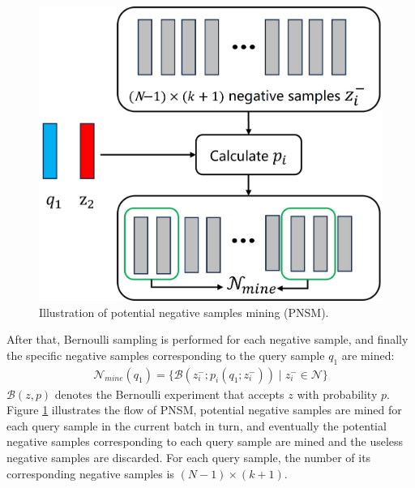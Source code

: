 \documentclass[review]{elsarticle}
\begin{document}
\begin{figure}[!t]
\centering

\includegraphics[scale=0.5]{figure4.jpg}
\caption{Illustration of potential negative samples mining (PNSM).}
\label{fig4}
\end{figure}

After that, Bernoulli sampling is performed for each negative sample, and finally the specific negative samples corresponding to the query sample $q_1$ are mined: 
\begin{equation}
\begin{aligned}
\mathcal{N}_{mine}(q_1)=\{ \mathcal{B}(z_i^{-};p_i(q_1;z_i^{-}))\mid z_i^{-}\in \mathcal{N}    \}
     \label{equation9}
\end{aligned}
\end{equation}
$\mathcal{B}(z,p)$ denotes the Bernoulli experiment that accepts $z$ with probability $p$. Figure \ref{fig4} illustrates the flow of PNSM, potential negative samples are mined for each query sample in the current batch in turn, and eventually the potential negative samples corresponding to each query sample are mined and the useless negative samples are discarded. For each query sample, the number of its corresponding negative samples is $ (N-1)\times(k+1) $.
\end{document}
